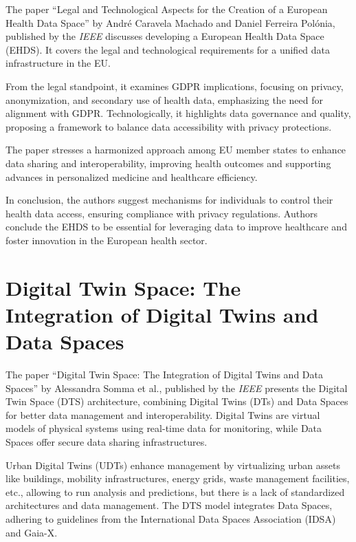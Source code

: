 The paper ``Legal and Technological Aspects for the Creation of a European Health Data Space'' by André Caravela Machado and Daniel Ferreira Polónia, published by the \textit{IEEE} discusses developing a European Health Data Space (EHDS)\cite{legal_and_technological_aspects_of_ehds}.
It covers the legal and technological requirements for a unified data infrastructure in the EU.

From the legal standpoint, it examines GDPR implications, focusing on privacy, anonymization, and secondary use of health data, emphasizing the need for alignment with GDPR.
Technologically, it highlights data governance and quality, proposing a framework to balance data accessibility with privacy protections.

The paper stresses a harmonized approach among EU member states to enhance data sharing and interoperability, improving health outcomes and supporting advances in personalized medicine and healthcare efficiency.

In conclusion, the authors suggest mechanisms for individuals to control their health data access, ensuring compliance with privacy regulations.
Authors conclude the EHDS to be essential for leveraging data to improve healthcare and foster innovation in the European health sector.

\section{Digital Twin Space: The Integration of Digital Twins and Data Spaces}\label{sec:digital-twin-space:-the-integration-of-digital-twins-and-data-spaces}

The paper ``Digital Twin Space: The Integration of Digital Twins and Data Spaces'' by Alessandra Somma et al., published by the \textit{IEEE} presents the Digital Twin Space (DTS) architecture, combining Digital Twins (DTs) and Data Spaces for better data management and interoperability\cite{digital_twins_and_data_spaces}.
Digital Twins are virtual models of physical systems using real-time data for monitoring, while Data Spaces offer secure data sharing infrastructures.

Urban Digital Twins (UDTs) enhance management by virtualizing urban assets like buildings, mobility infrastructures, energy grids, waste management facilities, etc., allowing to run analysis and predictions, but there is a lack of standardized architectures and data management.
The DTS model integrates Data Spaces, adhering to guidelines from the International Data Spaces Association (IDSA) and Gaia-X.

